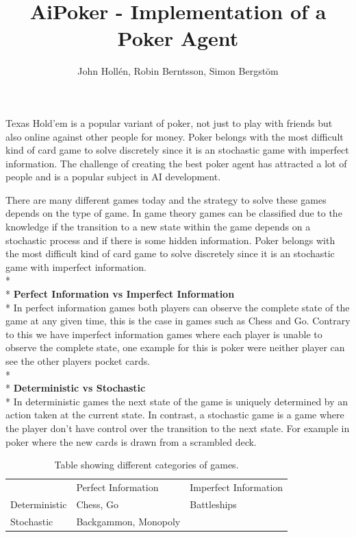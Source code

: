\documentclass[journal]{vgtc}                %
\title{AiPoker - Implementation of a Poker Agent}
\author{John Holl\'en, Robin Berntsson, Simon Bergst\"om}
\begin{document}

\maketitle 
Texas Hold'em is a popular variant of poker, not just to play with friends but also online against other people for money. Poker belongs with the most difficult kind of card game to solve discretely since it is an stochastic game with imperfect information. The challenge of creating the best poker agent has attracted a lot of people and is a popular subject in AI development.

There are many different games today and the strategy to solve these games depends on the type of game. In game theory games can be classified due to the knowledge if the transition to a new state within the game depends on a stochastic process and if there is some hidden information. Poker belongs with the most difficult kind of card game to solve discretely since it is an stochastic game with imperfect information.
\\*\\*
\textbf{Perfect Information vs Imperfect Information}\\*
In perfect information games both players can observe the complete state of the game at any given time, this is the case in games such as Chess and Go. Contrary to this we have imperfect information games where each player is unable to observe the complete state, one example for this is poker were neither player can see the other players pocket cards.
\\*\\*
\textbf{Deterministic vs Stochastic}\\*
In deterministic games the next state of the game is uniquely determined by an action taken at the current state. In contrast, a stochastic game is a game where the player don't have control over the transition to the next state. For example in poker where the new cards is drawn from a scrambled deck. 

\begin{table}[h]
\begin{tabular}{lll}
              & Perfect Information  & Imperfect Information \\
Deterministic & Chess, Go            & Battleships           \\
Stochastic    & Backgammon, Monopoly &                      
\end{tabular}
\caption{\label{tab:table1} Table showing different categories of games.}
\end{table}
\end{document}
